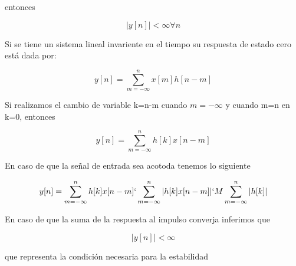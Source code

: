 entonces 

\begin{equation}
|y[n]|<\infty \forall n
\end{equation}

Si se tiene un sistema lineal invariente en el tiempo su respuesta de estado cero está dada por:

\begin{equation}
y[n]=\sum_{m=-\infty}^n x[m]h[n-m]
\end{equation}

Si realizamos el cambio de variable k=n-m cuando $m=-\infty$ y cuando m=n en k=0, entonces

\begin{equation}
y[n]=\sum_{m=-\infty}^n h[k]x[n-m]
\end{equation}

En caso de que la señal de entrada sea acotoda tenemos lo siguiente

\begin{equation}
y[n]=\sum_{m=-\infty}^n h[k]x[n-m] \lq \sum_{m=-\infty}^n |h[k]x[n-m]| \lq M\sum_{m=-\infty}^n |h[k]|
\end{equation}

En caso de que la suma de la respuesta al impulso converja inferimos que 

\begin{equation}
|y[n]|<\infty
\end{equation}

que representa la condición necesaria para la estabilidad